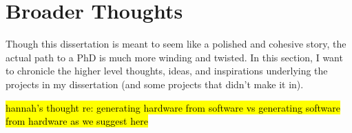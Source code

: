 \chapter{Broader Thoughts}

Though this dissertation
  is meant to seem like a polished and cohesive
  story,
  the actual path to a PhD is much
  more winding and twisted.
In this section, I want to chronicle
  the higher level thoughts,
  ideas, and inspirations
  underlying the projects in my dissertation
  (and some projects that didn't make it in).


\hl{hannah's thought re: generating hardware from software vs generating software from hardware as we suggest here } 